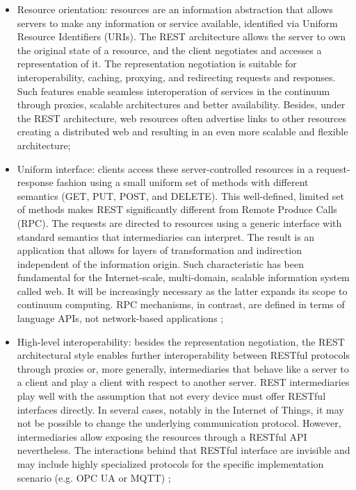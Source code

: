 \begin{itemize}
    \item Resource orientation: resources are an information abstraction that allows servers to make any information or service available, identified via Uniform Resource Identifiers (URIs). The REST architecture allows the server to own the original state of a resource, and the client negotiates and accesses a representation of it. The representation negotiation is suitable for interoperability, caching, proxying, and redirecting requests and responses. Such features enable seamless interoperation of services in the continuum through proxies, scalable architectures and better availability. Besides, under the REST architecture, web resources often advertise links to other resources creating a distributed web and resulting in an even more scalable and flexible architecture;
    \item Uniform interface: clients access these server-controlled resources in a request-response fashion using a small uniform set of methods with different semantics (GET, PUT, POST, and DELETE). This well-defined, limited set of methods makes REST significantly different from Remote Produce Calls (RPC). The requests are directed to resources using a generic interface with standard semantics that intermediaries can interpret. The result is an application that allows for layers of transformation and indirection independent of the information origin. Such characteristic has been fundamental for the Internet-scale, multi-domain, scalable information system called web. It will be increasingly necessary as the latter expands its scope to continuum computing. RPC mechanisms, in contrast, are defined in terms of language APIs, not network-based applications \cite{rest};
    \item High-level interoperability: besides the representation negotiation, the REST architectural style enables further interoperability between RESTful protocols through proxies or, more generally, intermediaries that behave like a server to a client and play a client with respect to another server. REST intermediaries play well with the assumption that not every device must offer RESTful interfaces directly. In several cases, notably in the Internet of Things, it may not be possible to change the underlying communication protocol. However, intermediaries allow exposing the resources through a RESTful API nevertheless. The interactions behind that RESTful interface are invisible and may include highly specialized protocols for the specific implementation scenario (e.g. OPC UA or MQTT) \cite{guinard2010resource};

\end{itemize}
